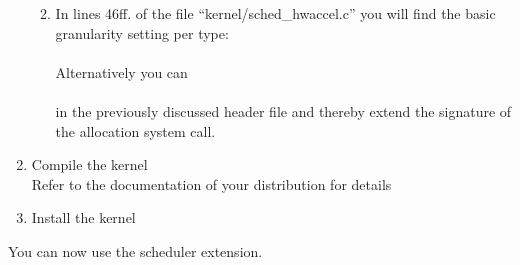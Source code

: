 \begin{enumerate}
\begin{enumerate}
\begin{verbatim}
					\end{verbatim}
			\item In lines 46ff. of the file ``kernel/sched\_hwaccel.c'' you will find the basic granularity setting
				per type:\\ \\
				Alternatively
				you can \\ \\ in the previously
				discussed header file and thereby extend the signature of the allocation
				system call.
		\end{enumerate}
	
	
	
	\item Compile the kernel\\
		Refer to the documentation of your distribution for details
	\item Install the kernel
\end{enumerate}

 You can now use the scheduler extension.


